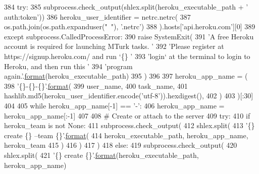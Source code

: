 \begin{DoxyCode}
384         \textcolor{keywordflow}{try}:
385             subprocess.check\_output(shlex.split(heroku\_executable\_path + \textcolor{stringliteral}{' auth:token'}))
386             heroku\_user\_identifier = netrc.netrc(
387                 os.path.join(os.path.expanduser(\textcolor{stringliteral}{"~"}), \textcolor{stringliteral}{'.netrc'})
388             ).hosts[\textcolor{stringliteral}{'api.heroku.com'}][0]
389         \textcolor{keywordflow}{except} subprocess.CalledProcessError:
390             \textcolor{keywordflow}{raise} SystemExit(
391                 \textcolor{stringliteral}{'A free Heroku account is required for launching MTurk tasks. '}
392                 \textcolor{stringliteral}{'Please register at https://signup.heroku.com/ and run `\{\} '}
393                 \textcolor{stringliteral}{'login` at the terminal to login to Heroku, and then run this '}
394                 \textcolor{stringliteral}{'program again.'}.\hyperlink{namespaceparlai_1_1chat__service_1_1services_1_1messenger_1_1shared__utils_a32e2e2022b824fbaf80c747160b52a76}{format}(heroku\_executable\_path)
395             )
396 
397     heroku\_app\_name = (
398         \textcolor{stringliteral}{'\{\}-\{\}-\{\}'}.\hyperlink{namespaceparlai_1_1chat__service_1_1services_1_1messenger_1_1shared__utils_a32e2e2022b824fbaf80c747160b52a76}{format}(
399             user\_name,
400             task\_name,
401             hashlib.md5(heroku\_user\_identifier.encode(\textcolor{stringliteral}{'utf-8'})).hexdigest(),
402         )
403     )[:30]
404 
405     \textcolor{keywordflow}{while} heroku\_app\_name[-1] == \textcolor{stringliteral}{'-'}:
406         heroku\_app\_name = heroku\_app\_name[:-1]
407 
408     \textcolor{comment}{# Create or attach to the server}
409     \textcolor{keywordflow}{try}:
410         \textcolor{keywordflow}{if} heroku\_team \textcolor{keywordflow}{is} \textcolor{keywordflow}{not} \textcolor{keywordtype}{None}:
411             subprocess.check\_output(
412                 shlex.split(
413                     \textcolor{stringliteral}{'\{\} create \{\} --team \{\}'}.\hyperlink{namespaceparlai_1_1chat__service_1_1services_1_1messenger_1_1shared__utils_a32e2e2022b824fbaf80c747160b52a76}{format}(
414                         heroku\_executable\_path, heroku\_app\_name, heroku\_team
415                     )
416                 )
417             )
418         \textcolor{keywordflow}{else}:
419             subprocess.check\_output(
420                 shlex.split(
421                     \textcolor{stringliteral}{'\{\} create \{\}'}.\hyperlink{namespaceparlai_1_1chat__service_1_1services_1_1messenger_1_1shared__utils_a32e2e2022b824fbaf80c747160b52a76}{format}(heroku\_executable\_path, heroku\_app\_name)

\end{DoxyCode}
